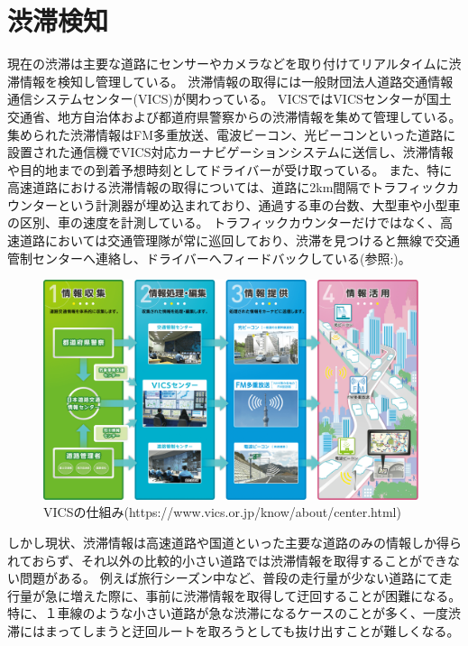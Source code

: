 \section{渋滞検知}
現在の渋滞は主要な道路にセンサーやカメラなどを取り付けてリアルタイムに渋滞情報を検知し管理している。
渋滞情報の取得には一般財団法人道路交通情報通信システムセンター(VICS)が関わっている。
VICSではVICSセンターが国土交通省、地方自治体および都道府県警察からの渋滞情報を集めて管理している。
集められた渋滞情報はFM多重放送、電波ビーコン、光ビーコンといった道路に設置された通信機でVICS対応カーナビゲーションシステムに送信し、渋滞情報や目的地までの到着予想時刻としてドライバーが受け取っている。
また、特に高速道路における渋滞情報の取得については、道路に2km間隔でトラフィックカウンターという計測器が埋め込まれており、通過する車の台数、大型車や小型車の区別、車の速度を計測している。
トラフィックカウンターだけではなく、高速道路においては交通管理隊が常に巡回しており、渋滞を見つけると無線で交通管制センターへ連絡し、ドライバーへフィードバックしている(参照:)。

\begin{figure}[htbp]
  \begin{center}
   \includegraphics[width=11cm]{figs/vics.png}
  \end{center}
  \caption{VICSの仕組み(https://www.vics.or.jp/know/about/center.html)}
  \label{fig:vics_system}
\end{figure}

しかし現状、渋滞情報は高速道路や国道といった主要な道路のみの情報しか得られておらず、それ以外の比較的小さい道路では渋滞情報を取得することができない問題がある。
例えば旅行シーズン中など、普段の走行量が少ない道路にて走行量が急に増えた際に、事前に渋滞情報を取得して迂回することが困難になる。
特に、１車線のような小さい道路が急な渋滞になるケースのことが多く、一度渋滞にはまってしまうと迂回ルートを取ろうとしても抜け出すことが難しくなる。

